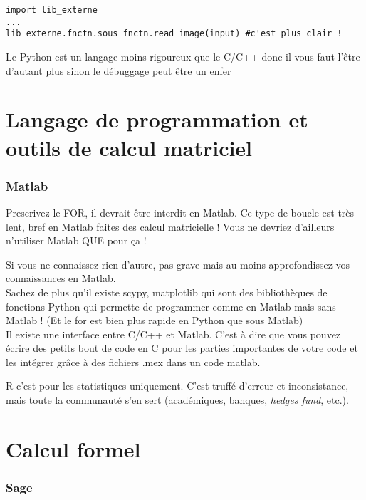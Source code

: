 \begin{lstlisting}[style=pythonsty]
import lib_externe
...
lib_externe.fnctn.sous_fnctn.read_image(input) #c'est plus clair !
\end{lstlisting}
Le Python est un langage moins rigoureux que le C/C++ donc il vous faut l'être d'autant plus
 sinon le débuggage peut être un enfer 




\section{Langage de programmation et outils de calcul matriciel}



\subsubsection*{Matlab}

Prescrivez le FOR, il devrait être interdit en Matlab. Ce type de boucle est très lent, bref en Matlab 
faites des calcul matricielle ! Vous ne devriez d'ailleurs n'utiliser Matlab QUE pour ça !

Si vous ne connaissez rien d'autre, pas grave mais au moins approfondissez vos connaissances 
en Matlab.\\

Sachez de plus qu'il existe scypy, matplotlib  qui sont des bibliothèques de fonctions Python 
qui permette de programmer comme en Matlab mais sans Matlab ! (Et le for est bien plus rapide 
en Python que sous Matlab)\\

Il existe une interface entre C/C++ et Matlab. C'est à dire que vous pouvez écrire des petits bout de code en C
pour les parties importantes de votre code et les intégrer grâce à des fichiers .mex dans un code matlab.


R c'est pour les statistiques uniquement. C'est truffé d'erreur et inconsistance, mais
toute la communauté s'en sert (académiques, banques, \textit{hedges fund}, etc.).

\section{Calcul formel}


\subsubsection*{Sage}

